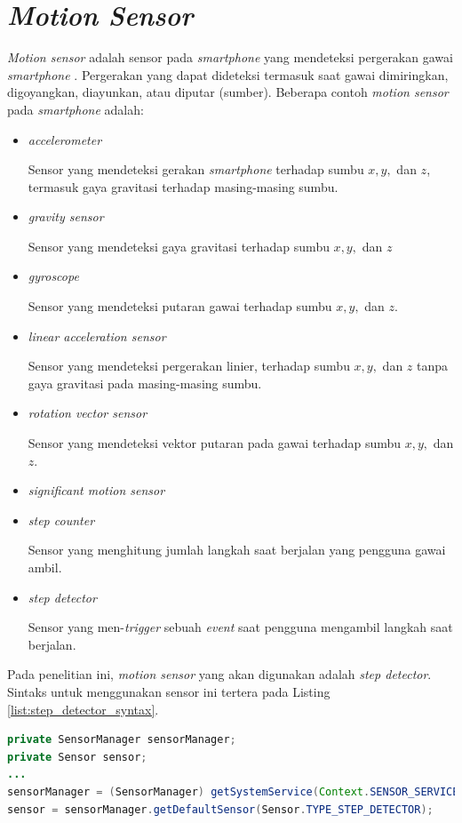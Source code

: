 \section{\textit{Motion Sensor}}
\label{subs:motion-sensor}
\textit{Motion sensor} adalah sensor pada \textit{smartphone} yang mendeteksi pergerakan gawai \textit{smartphone} %
. Pergerakan yang dapat dideteksi termasuk saat gawai dimiringkan, digoyangkan, diayunkan, atau diputar (sumber). Beberapa contoh \textit{motion sensor} pada \textit{smartphone} adalah:
\begin{itemize}
	\item \textit{accelerometer}
	
	Sensor yang mendeteksi gerakan \textit{smartphone} terhadap sumbu $x, y,$ dan $z$, termasuk gaya gravitasi terhadap masing-masing sumbu.
	\item \textit{gravity sensor}
	
	Sensor yang mendeteksi gaya gravitasi terhadap sumbu $x, y,$ dan $z$
	\item \textit{gyroscope}
	
	Sensor yang mendeteksi putaran gawai terhadap sumbu $x, y,$ dan $z$.
	\item \textit{linear acceleration sensor}
	
	Sensor yang mendeteksi pergerakan linier, terhadap sumbu $x, y,$ dan $z$ tanpa gaya gravitasi pada masing-masing sumbu.
	\item \textit{rotation vector sensor}
	
	Sensor yang mendeteksi vektor putaran pada gawai terhadap sumbu $x, y,$ dan $z$.
	\item \textit{significant motion sensor}
	\item \textit{step counter}
	
	Sensor yang menghitung jumlah langkah saat berjalan yang pengguna gawai ambil.
	\item \textit{step detector}
	
	Sensor yang men-\textit{trigger} sebuah \textit{event} saat pengguna mengambil langkah saat berjalan.
\end{itemize}

Pada penelitian ini, \textit{motion sensor} yang akan digunakan adalah \textit{step detector}. Sintaks untuk menggunakan sensor ini tertera pada Listing \ref{list:step_detector_syntax}.

\begin{lstlisting}[caption={Sintaks menggunakan sensor \textit{step detector}},label={list:step_detector_syntax},language=java]
private SensorManager sensorManager;
private Sensor sensor;
...
sensorManager = (SensorManager) getSystemService(Context.SENSOR_SERVICE);
sensor = sensorManager.getDefaultSensor(Sensor.TYPE_STEP_DETECTOR);
\end{lstlisting} 

